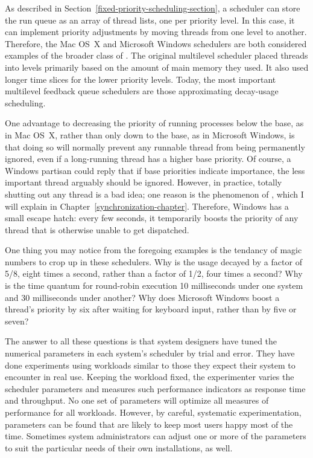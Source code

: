 As described in Section~\ref{fixed-priority-scheduling-section}, a
scheduler can store the run queue as an array of thread lists, one per
priority level.  In this case, it can implement priority adjustments
by moving threads from one level to another.  Therefore, the Mac OS~X
and Microsoft Windows schedulers are both considered examples of the
broader class of .  The
original multilevel scheduler placed threads into levels primarily
based on the amount of main memory they used.  It also used longer
time slices for the lower priority levels.  Today, the most important
multilevel feedback queue schedulers are those approximating
decay-usage scheduling.

One advantage to decreasing the priority of running processes below
the base, as in Mac OS~X, rather than only down to the base, as in
Microsoft Windows, is that doing so will normally prevent any runnable
thread from being permanently ignored, even if a long-running thread
has a higher base priority.  Of course, a Windows partisan could reply
that if base priorities indicate importance, the less important thread
arguably should be ignored.  However, in practice, totally shutting
out any thread is a bad idea; one reason is the phenomenon of
, which I will explain in Chapter~\ref{synchronization-chapter}.
Therefore, Windows has a small escape hatch: every few seconds, it
temporarily boosts the priority of any thread that is otherwise unable
to get dispatched.

One thing you may notice from the foregoing examples is the tendancy of
magic numbers to crop up in these schedulers.  Why is the usage
decayed by a factor of 5/8, eight times a second, rather than a factor
of 1/2, four times a second?  Why is the time quantum for round-robin
execution 10 milliseconds under one system and 30 milliseconds under
another?  Why does Microsoft Windows boost a thread's priority by six
after waiting for keyboard input, rather than by five or seven?

The answer to all these questions is that system designers have
tuned the numerical parameters in each system's scheduler by trial
and error.  They have done experiments using workloads similar to those
they expect their system to encounter in real use.  Keeping the
workload fixed, the experimenter varies the scheduler parameters and
measures such performance indicators as response time and throughput.
No one set of parameters will optimize all measures of performance for
all workloads.  However, by careful, systematic experimentation,
parameters can be found that are likely to keep most users happy most
of the time.  Sometimes system administrators can adjust one or more
of the parameters to suit the particular needs of their own
installations, as well.


